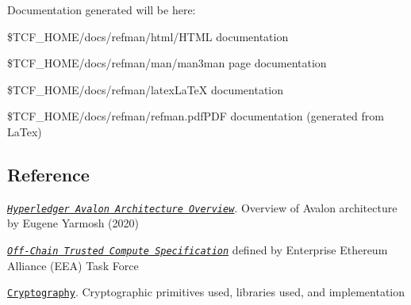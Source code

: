 Documentation generated will be here\+:
\begin{DoxyItemize}
\item {\ttfamily \$\+T\+C\+F\+\_\+\+H\+O\+ME/docs/refman/html/}H\+T\+ML documentation
\item {\ttfamily \$\+T\+C\+F\+\_\+\+H\+O\+ME/docs/refman/man/man3}man page documentation
\item {\ttfamily \$\+T\+C\+F\+\_\+\+H\+O\+ME/docs/refman/latex}La\+TeX documentation
\item {\ttfamily \$\+T\+C\+F\+\_\+\+H\+O\+ME/docs/refman/refman.pdf}P\+DF documentation (generated from La\+Tex)
\end{DoxyItemize}

\subsection*{Reference}


\begin{DoxyItemize}
\item \href{https://github.com/hyperledger/avalon/blob/master/docs//avalon-arch.pdf}{\tt {\itshape Hyperledger Avalon Architecture Overview}}. Overview of Avalon architecture by Eugene Yarmosh (2020)
\item \href{https://entethalliance.github.io/trusted-computing/spec.html}{\tt {\itshape Off-\/\+Chain Trusted Compute Specification}} defined by Enterprise Ethereum Alliance (E\+EA) Task Force
\item \href{https://github.com/hyperledger/avalon/blob/master/common/cpp/crypto/README.m%64}{\tt Cryptography}. Cryptographic primitives used, libraries used, and implementation 
\end{DoxyItemize}